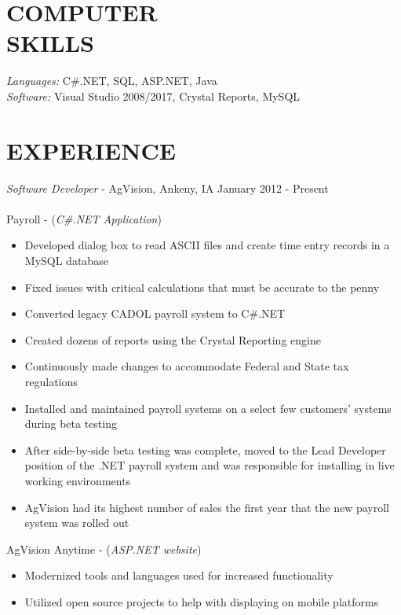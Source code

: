 \documentclass[line,margin]{res}
\begin{document}
\address{(641) 814-2018 $\vert$ aaron@Aarons.site}

\begin{resume}

\section{COMPUTER \\ SKILLS} 
	{\sl Languages:} C\#.NET, SQL, ASP.NET, Java\\
	{\sl Software:} Visual Studio 2008/2017, Crystal Reports, MySQL
 
\section{EXPERIENCE} {\sl Software Developer} - AgVision, Ankeny, IA \hfill January 2012 - Present \\ \\
	Payroll - ({\sl C\#.NET Application})
    \begin{itemize}  %
   		\item Developed dialog box to read ASCII files and create time entry records in a MySQL database
    	\item Fixed issues with critical calculations that must be accurate to the penny
    	\item Converted legacy CADOL payroll system to C\#.NET
    	\item Created dozens of reports using the Crystal Reporting engine
    	\item Continuously made changes to accommodate Federal and State tax regulations
    	\item Installed and maintained payroll systems on a select few customers' systems during beta testing
    	\item After side-by-side beta testing was complete, moved to the Lead Developer position of the .NET payroll system and was responsible for installing in live working environments
    	\item AgVision had its highest number of sales the first year that the new payroll system was rolled out
	\end{itemize}
	AgVision Anytime - ({\sl ASP.NET website})
	\begin{itemize}
		\item Modernized tools and languages used for increased functionality
		\item Utilized open source projects to help with displaying on mobile platforms

\end{itemize}
\end{resume}
\end{document}
